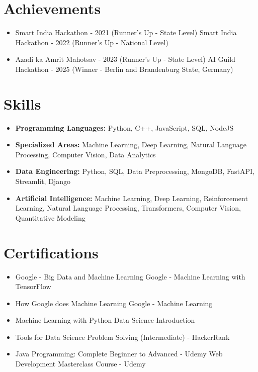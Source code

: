 \documentclass[a4paper,10pt]{article}
\begin{document}
\section*{Achievements}
\begin{itemize}
\item Smart India Hackathon - 2021 (Runner's Up - State Level) \hfill Smart India Hackathon - 2022 (Runner's Up - National Level)
\item Azadi ka Amrit Mahotsav - 2023 (Runner's Up - State Level) \hfill AI Guild Hackathon - 2025 (Winner - Berlin and Brandenburg State, Germany)
\end{itemize}

\section*{Skills}
\begin{itemize}
  \item \textbf{Programming Languages:} Python, C++, JavaScript, SQL, NodeJS
  \item \textbf{Specialized Areas:} Machine Learning, Deep Learning, Natural Language Processing, Computer Vision, Data Analytics
  \item \textbf{Data Engineering:} Python, SQL, Data Preprocessing, MongoDB, FastAPI, Streamlit, Django
  \item \textbf{Artificial Intelligence:} Machine Learning, Deep Learning, Reinforcement Learning, Natural Language Processing, Transformers, Computer Vision, Quantitative Modeling
\end{itemize}

\section*{Certifications}
\begin{itemize}
\item Google - Big Data and Machine Learning \hfill Google - Machine Learning with TensorFlow
\item How Google does Machine Learning \hfill Google - Machine Learning
\item Machine Learning with Python \hfill Data Science Introduction
\item Tools for Data Science \hfill Problem Solving (Intermediate) - HackerRank
\item Java Programming: Complete Beginner to Advanced - Udemy \hfill Web Development Masterclass Course - Udemy
\end{itemize}
\end{document}

